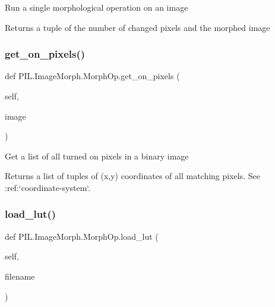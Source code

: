 \begin{DoxyVerb}Run a single morphological operation on an image

Returns a tuple of the number of changed pixels and the
morphed image\end{DoxyVerb}
 \mbox{\label{classPIL_1_1ImageMorph_1_1MorphOp_ad7b9fa495d1c7b53ffa643eb859ec688}} 
\subsubsection{\texorpdfstring{get\+\_\+on\+\_\+pixels()}{get\_on\_pixels()}}
{\footnotesize\ttfamily def P\+I\+L.\+Image\+Morph.\+Morph\+Op.\+get\+\_\+on\+\_\+pixels (\begin{DoxyParamCaption}\item[{}]{self,  }\item[{}]{image }\end{DoxyParamCaption})}

\begin{DoxyVerb}Get a list of all turned on pixels in a binary image

Returns a list of tuples of (x,y) coordinates
of all matching pixels. See :ref:`coordinate-system`.\end{DoxyVerb}
 \mbox{\label{classPIL_1_1ImageMorph_1_1MorphOp_a1b3408b61ade6e6d9d3584f59fc07065}} 
\subsubsection{\texorpdfstring{load\+\_\+lut()}{load\_lut()}}
{\footnotesize\ttfamily def P\+I\+L.\+Image\+Morph.\+Morph\+Op.\+load\+\_\+lut (\begin{DoxyParamCaption}\item[{}]{self,  }\item[{}]{filename }\end{DoxyParamCaption})}

